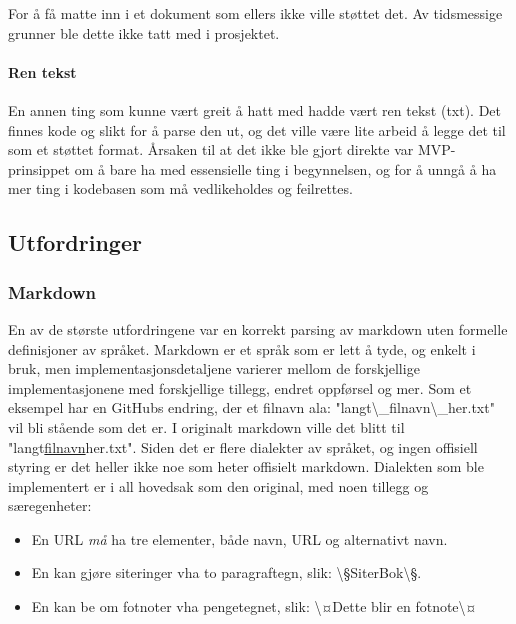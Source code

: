 \documentclass[11pt]{article}
\begin{document}
For å få matte inn i et dokument som ellers ikke ville støttet det.
Av tidsmessige grunner ble dette ikke tatt med i prosjektet.



\paragraph{Ren tekst}



En annen ting som kunne vært greit å hatt med hadde vært ren tekst (txt). Det finnes kode og slikt for å parse den ut, og det ville være lite arbeid å legge det til som et støttet format.
Årsaken til at det ikke ble gjort direkte var MVP-prinsippet om å bare ha med essensielle ting i begynnelsen, og for å unngå å ha mer ting i kodebasen som må vedlikeholdes og feilrettes.



\subsection{Utfordringer}



\subsubsection{Markdown}
En av de største utfordringene var en korrekt parsing av markdown uten formelle definisjoner av språket. Markdown er et språk som er lett å tyde, og enkelt i bruk, men implementasjonsdetaljene varierer mellom de forskjellige implementasjonene med forskjellige tillegg, endret oppførsel og mer.
Som et eksempel har en GitHubs endring, der et filnavn ala: "langt\textbackslash \_filnavn\textbackslash \_her.txt" vil bli stående som det er. I originalt markdown ville det blitt til "langt\uline{filnavn}her.txt". Siden det er flere dialekter av språket, og ingen offisiell styring er det heller ikke noe som heter offisielt markdown. Dialekten som ble implementert er i all hovedsak som den original, med noen tillegg og særegenheter:




\begin{itemize}
\item En URL \emph{må} ha tre elementer, både navn, URL og alternativt navn.
\item En kan gjøre siteringer vha to paragraftegn, slik: \textbackslash §SiterBok\textbackslash §.
\item En kan be om fotnoter vha pengetegnet, slik: \textbackslash ¤Dette blir en fotnote\textbackslash ¤
\end{itemize}
\end{document}
